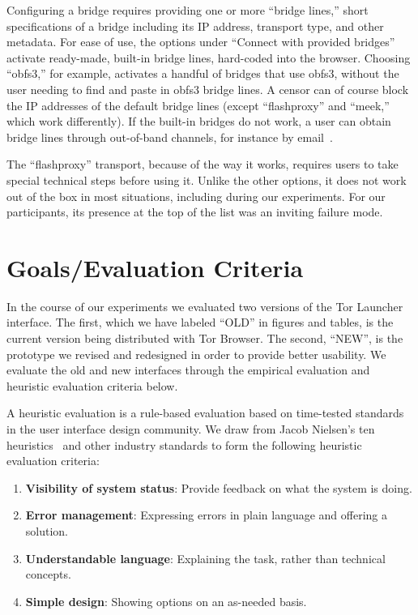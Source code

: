 \documentclass[USenglish,oneside,twocolumn]{article}
\begin{document}
Configuring a bridge requires providing one or more
``bridge lines,'' short specifications of a bridge
including its IP address, transport type, and other metadata.
For ease of use, the options under ``Connect with provided bridges''
activate ready-made, built-in bridge lines,
hard-coded into the browser.
Choosing ``obfs3,'' for example, activates a handful
of bridges that use obfs3, without the user needing
to find and paste in obfs3 bridge lines.
A censor can of course block the IP addresses of the default bridge lines
(except ``flashproxy'' and ``meek,'' which work differently).
If the built-in bridges do not work, a user can obtain bridge lines
through out-of-band channels, for instance by email~\cite{bridgedb}.

The ``flashproxy'' transport, because of the way it works,
requires users to take special technical steps before using it.
Unlike the other options, it does not work out of the box
in most situations, including during our experiments.
For our participants, its presence at the top of the list
was an inviting failure mode.

\section{Goals/Evaluation Criteria}
\label{sec:goals}
In the course of our experiments we evaluated two versions
of the Tor Launcher interface.
The first, which we have labeled ``OLD'' in figures and tables,
is the current version being distributed with Tor Browser.
The second, ``NEW'', is the prototype we revised and redesigned
in order to provide better usability.
We evaluate the old and new interfaces
through the empirical evaluation and heuristic evaluation criteria below. 

A heuristic evaluation is a rule-based evaluation based on time-tested standards
in the user interface design community. We draw from Jacob Nielsen's ten heuristics~\cite{nielsen1994heuristic}
and other industry standards to form the following heuristic evaluation criteria: \\

\begin{enumerate}
    \item  {\bfseries Visibility of system status}: Provide feedback on what the system is doing. 
    \item  {\bfseries Error management}: Expressing errors in plain language and offering a solution. 
    \item  {\bfseries Understandable language}: Explaining the task, rather than technical concepts. 
    \item  {\bfseries Simple design}: Showing options on an as-needed basis. 
\end{enumerate}
\end{document}
